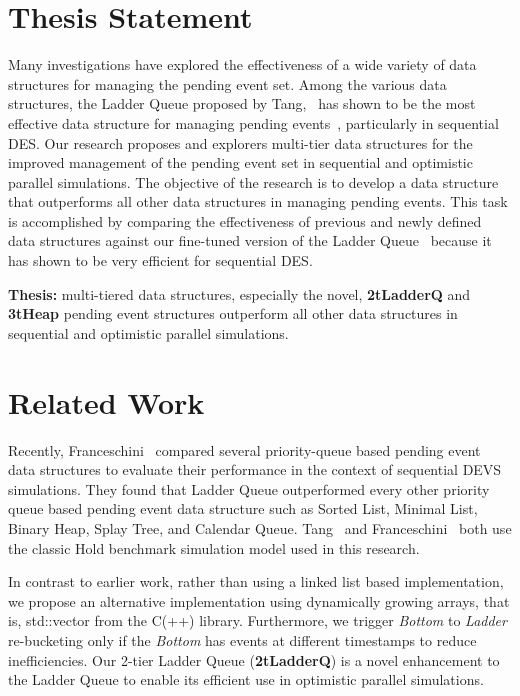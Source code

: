 \section*{Thesis Statement}

Many investigations have explored the effectiveness of a wide variety
of data structures for managing the pending event set. Among the
various data structures, the Ladder Queue proposed by
Tang,~\cite{tang-05} has shown to be the most effective data structure
for managing pending events~\cite{dickman-13,franceschini-15},
particularly in sequential DES. Our research proposes and explorers
multi-tier data structures for the improved management of the pending
event set in sequential and optimistic parallel simulations. The
objective of the research is to develop a data structure that
outperforms all other data structures in managing pending events. This
task is accomplished by comparing the effectiveness of previous and
newly defined data structures against our fine-tuned version of the
Ladder Queue~\cite{tang-05} because it has shown to be very efficient
for sequential DES. \newline

\textbf{Thesis:} multi-tiered data structures, especially the novel,
\textbf{2tLadderQ} and \textbf{3tHeap} pending event structures
outperform all other data structures in sequential and optimistic
parallel simulations.

\section*{Related Work}

Recently, Franceschini~\cite{franceschini-15} compared several
priority-queue based pending event data structures to evaluate their
performance in the context of sequential DEVS simulations. They found
that Ladder Queue outperformed every other priority queue based
pending event data structure such as Sorted List, Minimal List, Binary
Heap, Splay Tree, and Calendar Queue. Tang~\cite{tang-05} and
Franceschini~\cite{franceschini-15} both use the classic Hold
benchmark simulation model used in this research.

In contrast to earlier work, rather than using a linked list based
implementation, we propose an alternative implementation using
dynamically growing arrays, that is, std::vector from the C(++)
library. Furthermore, we trigger \textit{Bottom} to \textit{Ladder}
re-bucketing only if the \textit{Bottom} has events at different
timestamps to reduce inefficiencies. Our 2-tier Ladder Queue
(\textbf{2tLadderQ}) is a novel enhancement to the Ladder Queue to
enable its efficient use in optimistic parallel simulations.

